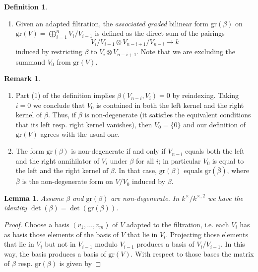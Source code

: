 \documentclass{article}
\newtheorem{lem}[thm]{Lemma}
\theoremstyle{definition}
\newtheorem{rem}[thm]{Remark}
\newtheorem{dfn}[thm]{Definition}
\numberwithin{equation}{subsection}
\renewcommand{\-}{\hyp{}}
\begin{document}
\begin{appendices}
\begin{dfn}
\begin{enumerate}
		\item Given an adapted filtration, the \emph{associated graded} bilinear form $\mathrm{gr}(\beta)$ on $\mathrm{gr}(V)=\bigoplus_{i=1}^n V_i/V_{i-1}$ is defined as the direct sum of the pairings
		\[ V_i/V_{i-1} \otimes V_{n-i+1}/V_{n-i} \to k \]
		induced by restricting $\beta$ to $V_i \otimes V_{n-i+1}$. Note that we are excluding the summand $V_0$ from $\mathrm{gr}(V)$.
	\end{enumerate}
\end{dfn}

\begin{rem}
	\begin{enumerate}
		\item Part (1) of the definition implies $\beta(V_{n-i},V_i)=0$ by reindexing. Taking $i=0$ we conclude that $V_0$ is contained in both the left kernel and the right kernel of $\beta$. Thus, if $\beta$ is non-degenerate (it satisfies the equivalent conditions that its left resp. right kernel vanishes), then $V_0=\{0\}$ and our definition of $\mathrm{gr}(V)$ agrees with the usual one.
		
		\item The form $\mathrm{gr}(\beta)$ is non-degenerate if and only if $V_{n-i}$ equals both the left and the right annihilator of $V_i$ under $\beta$ for all $i$; in particular $V_0$ is equal to the left and the right kernel of $\beta$. In that case, $\mathrm{gr}(\beta)$  equals $\mathrm{gr}(\bar\beta)$, where $\bar\beta$ is the non-degenerate form on $V/V_0$ induced by $\beta$.
	\end{enumerate}
\end{rem}

\begin{lem} \label{lem:grbetadet}
	Assume $\beta$ and $\mathrm{gr}(\beta)$ are non-degenerate. In $k^\times/k^{\times,2}$ we have the identity $\det(\beta) = \det(\mathrm{gr}(\beta))$.
\end{lem}
\begin{proof}
	Choose a basis $(v_1,\dots,v_m)$ of $V$ adapted to the filtration, i.e. each $V_i$ has as basis those elements of the basis of $V$ that lie in $V_i$. Projecting those elements that lie in $V_i$ but not in $V_{i-1}$ modulo $V_{i-1}$ produces a basis of $V_i/V_{i-1}$. In this way, the basis produces a basis of $\mathrm{gr}(V)$. With respect to those bases the matrix of $\beta$ resp. $\mathrm{gr}(\beta)$ is given by 
	

\end{proof}
\end{appendices}
\end{document}
